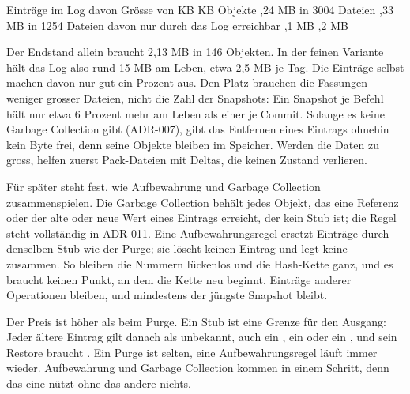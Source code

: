 {\startplacetable[title={Eine nachgespielte Sitzung},reference=tab:retention]
\startxtable[frame=off]
\startxrow[topframe=on,bottomframe=on]
 \stopxcell
{} \stopxcell
{} \stopxcell
\stopxrow
\startxrow
\startxcell Einträge im Log \stopxcell
{} \stopxcell
{} \stopxcell
\stopxrow
\startxrow
\startxcell davon  \stopxcell
{} \stopxcell
{} \stopxcell
\stopxrow
\startxrow
\startxcell Grösse von  \stopxcell
{} KB \stopxcell
{} KB \stopxcell
\stopxrow
\startxrow
\startxcell Objekte \stopxcell
{},24 MB in 3004 Dateien \stopxcell
{},33 MB in 1254 Dateien \stopxcell
\stopxrow
\startxrow
\startxcell davon nur durch das Log erreichbar \stopxcell
{},1 MB \stopxcell
{},2 MB \stopxcell
\stopxrow
\stopxtable
\stopplacetable

Der Endstand allein braucht 2,13 MB in 146 Objekten. In der feinen Variante hält das Log also
rund 15 MB am Leben, etwa 2,5 MB je Tag. Die Einträge selbst machen davon nur gut ein Prozent
aus. Den Platz brauchen die Fassungen weniger grosser Dateien, nicht die Zahl der Snapshots:
Ein Snapshot je Befehl hält nur etwa 6 Prozent mehr am Leben als einer je Commit. Solange es
keine Garbage Collection gibt (ADR-007), gibt das Entfernen eines Eintrags ohnehin kein Byte
frei, denn seine Objekte bleiben im Speicher. Werden die Daten zu gross, helfen zuerst
Pack-Dateien mit Deltas, die keinen Zustand verlieren.

Für später steht fest, wie Aufbewahrung und Garbage Collection zusammenspielen. Die Garbage
Collection behält jedes Objekt, das eine Referenz oder der alte oder neue Wert eines Eintrags
erreicht, der kein Stub ist; die Regel steht vollständig in ADR-011. Eine Aufbewahrungsregel
ersetzt Einträge  durch denselben Stub wie der Purge;
sie löscht keinen Eintrag und legt keine zusammen. So bleiben die Nummern lückenlos und die
Hash-Kette ganz, und es braucht keinen Punkt, an dem die Kette neu beginnt. Einträge anderer
Operationen bleiben, und mindestens der jüngste Snapshot bleibt.

Der Preis ist höher als beim Purge. Ein Stub ist eine Grenze für den Ausgang: Jeder ältere
Eintrag gilt danach als unbekannt, auch ein , ein  oder ein
, und sein Restore braucht . Ein Purge ist selten, eine
Aufbewahrungsregel läuft immer wieder. Aufbewahrung und Garbage Collection kommen in einem
Schritt, denn das eine nützt ohne das andere nichts.

}
